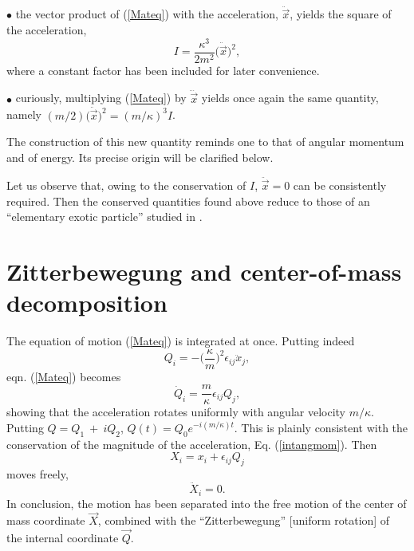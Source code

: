 \documentclass[a4paper,11pt]{article}
\let\ssection=\section
\renewcommand{\section}{\setcounter{equation}{0}\ssection}
\newcommand{\vx}{{\vec x}}
\def\vQ{{\vec Q}}
\def\vx{{\vec x}}
\def\vX{{\vec X}}
\begin{document}
$\bullet$  the vector product of
(\ref{Mateq}) with the acceleration, $\ddot{\vx}$,
yields the square of the acceleration,
\begin{equation}
     I=\frac{\kappa^3}{2m^2}\big(\ddot{\vx}\big)^2,
     \label{intangmom}
\end{equation}
where a constant factor
has been included for later convenience.

$\bullet$ curiously, multiplying (\ref{Mateq}) by $\dddot{\vx}$ yields
once again the same  quantity, namely
$(m/2)\big(\ddot{\vx}\big)^2=(m/\kappa)^3I$.

The construction of this new quantity reminds one to that
of  angular momentum and of energy.
Its precise origin will be clarified below.

Let us observe that, owing to the conservation
of $I$, $\ddot{\vx}=0$ can be consistently required.
Then the conserved quantities found above
reduce to those of an ``elementary exotic particle'' studied
in \cite{DH}.



\section{Zitterbewegung and center-of-mass
decomposition}\label{NRmotion}

The equation of motion (\ref{Mateq}) is integrated at once.
Putting indeed
\begin{equation}
     Q_{i}=
     -\big(\frac{\kappa}{m}\big)^2\epsilon_{ij}\ddot{x}_{j},
     \label{intcoord}
\end{equation}
eqn. (\ref{Mateq}) becomes
\begin{equation}
     \dot{Q}_{i}=\frac{m}{\kappa}\epsilon_{ij}Q_{j},
     \label{Qeq}
\end{equation}
showing that  the
acceleration rotates uniformly with angular velocity
$m/\kappa$. Putting $Q=Q_{1}~+~iQ_{2}$, $Q(t)=Q_{0}e^{-i(m/\kappa)t}$.
This is plainly consistent with the conservation
of the magnitude of the acceleration, Eq. (\ref{intangmom}). Then
\begin{equation}
     X_{i}=x_{i}+\epsilon_{ij}Q_{j}
     \label{CMcoord}
\end{equation}
moves freely,
\begin{equation}
     \ddot{X}_{i}=0.
     \label{CMmot}
\end{equation}
In conclusion, the motion has been separated into the
free motion of the center of mass coordinate
$\vX$, combined with the ``Zitterbewegung'' [uniform rotation] of the
internal coordinate $\vQ$.
\end{document}
